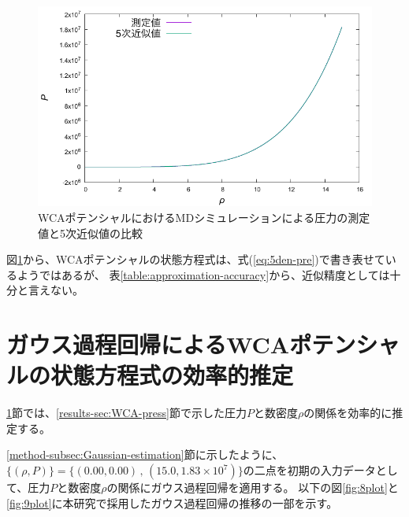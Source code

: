 \documentclass[titlepage]{jsreport}
\begin{document}
{{{\begin{figure}[htbp]
    \begin{center}
        \includegraphics[width=14cm]{fig/5den-pre.pdf}
    \end{center}
    \caption{WCAポテンシャルにおけるMDシミュレーションによる圧力の測定値と5次近似値の比較}
    \label{fig:5den-pre}
\end{figure}

\newpage
図\ref{fig:5den-pre}から、WCAポテンシャルの状態方程式は、式(\ref{eq:5den-pre})で書き表せているようではあるが、
表\ref{table:approximation-accuracy}から、近似精度としては十分と言えない。


\section{ガウス過程回帰によるWCAポテンシャルの状態方程式の効率的推定}\label{results-sec:Gauss}
\ref{results-sec:Gauss}節では、\ref{results-sec:WCA-press}節で示した圧力$P$と数密度$\rho$の関係を効率的に推定する。

\ref{method-subsec:Gaussian-estimation}節に示したように、$\{(\rho,P)\}=\{(0.00,0.00)\,,\,(15.0,1.83×10^7)\}$の二点を初期の入力データとして、圧力$P$と数密度$\rho$の関係にガウス過程回帰を適用する。
以下の図\ref{fig:8plot}と\ref{fig:9plot}に本研究で採用したガウス過程回帰の推移の一部を示す。

}}}
\end{document}
